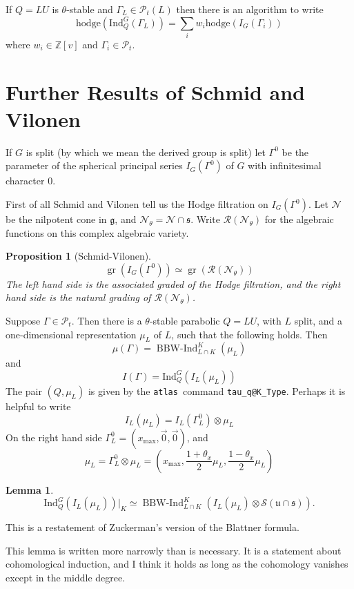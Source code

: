 \documentclass[12pt,leqno]{article}
\newtheorem{lemma}[equation]{Lemma}
\newtheorem{proposition}[equation]{Proposition}
\newcommand{\hodge}{\text{hodge}}
\DeclareMathOperator{\gr}{\text{gr}}
\DeclareMathOperator{\bbwind}{\text{BBW-Ind}}
\newcommand{\Ind}{\text{Ind}}
\newcommand\Pt{\mathcal P_t}
\renewcommand{\S}{\mathcal S}
\newcommand{\Z}{\mathbb Z}
\newcommand{\ucaps}{\mathfrak u\cap\mathfrak s}
\renewcommand{\sec}[1]{\section{#1}
\renewcommand{\theequation}{\thesection.\arabic{equation}}
  \setcounter{equation}{0}}
\newcommand{\g}{\mathfrak g}
\newcommand{\atlas}{{\tt atlas~}}
\newcommand{\ntheta}{\mathcal N_\theta}
\renewcommand{\sec}[1]{\section{#1}
\renewcommand{\theequation}{\thesection.\arabic{equation}}
  \setcounter{equation}{0}}
\begin{document}
\medskip

 If $Q=LU$ is $\theta$-stable and $\Gamma_L\in\Pt(L)$ then there is an algorithm to write
$$
\hodge(\Ind_Q^G(\Gamma_L))=\sum_i w_i \hodge(I_G(\Gamma_i))
$$
where $w_i\in\Z[v]$ and $\Gamma_i\in \Pt$.

\sec{Further Results of Schmid and Vilonen}
\label{s:further}

If $G$ is split (by which we mean the derived group is split) let
$\Gamma^0$ be the parameter of the spherical principal series
$I_G(\Gamma^0)$ of $G$ with infinitesimal character $0$.

First of all Schmid and Vilonen tell us the Hodge filtration on
$I_G(\Gamma^0)$. Let $\mathcal N$ be the nilpotent cone in $\g$, and
$\mathcal N_\theta=\mathcal N\cap\mathfrak s$.
Write $\mathcal R(\ntheta)$ for the algebraic functions on this complex algebraic variety.

\begin{proposition}[Schmid-Vilonen]
\label{p:sphericalhodge}
\normalfont
$$
\gr(I_G(\Gamma^0))\simeq \gr(\mathcal R(\mathcal N_\theta))
$$
The left hand side is the associated graded of the Hodge filtration,
and the right hand side is the natural grading of $\mathcal R(\ntheta)$.
\end{proposition}

Suppose $\Gamma\in\Pt$. Then there is a $\theta$-stable parabolic
$Q=LU$, with $L$ split, and a one-dimensional representation $\mu_L$
of $L$, such that the following holds.
Then
\begin{equation}
\label{e:mubbwind}
\mu(\Gamma)=\bbwind_{L\cap K}^K(\mu_L)
\end{equation}
and
\begin{equation}
\label{e:Igamma}
I(\Gamma)=\Ind_Q^G(I_L(\mu_L))
\end{equation}
The pair $(Q,\mu_L)$ is given by the \atlas command {\tt tau\_q@K\_Type}.
Perhaps it is helpful to write
$$
I_L(\mu_L)=I_L(\Gamma^0_L)\otimes\mu_L
$$
On the right hand side  $\Gamma^0_L=(x_{\text{max}},\vec 0,\vec 0)$, and
$$
\mu_L=\Gamma^0_L\otimes\mu_L=(x_{\text{max}},\frac{1+\theta_x}2\mu_L,\frac{1-\theta_x}2\mu_L)
$$


\begin{lemma}
\normalfont
$$
\Ind_Q^G(I_L(\mu_L))|_K\simeq\bbwind_{L\cap K}^K(I_L(\mu_L)\otimes \S(\ucaps)).
$$
\end{lemma}
This is a restatement of Zuckerman's version of the Blattner formula.

\begin{remarkplain}
\label{r:narrow}
This lemma is written more narrowly than is necessary.
It is a statement about cohomological induction, and I think it holds as long as the
cohomology vanishes except in the middle degree.
\end{remarkplain}
\end{document}
